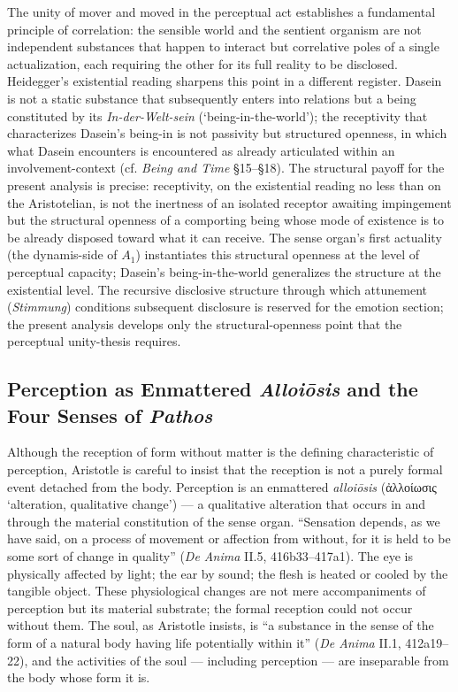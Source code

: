 \documentclass{article}
\newcommand{\gk}[1]{{\greekfont #1}}
\begin{document}
The unity of mover and moved in the perceptual act establishes a fundamental principle of correlation: the sensible world and the sentient organism are not independent substances that happen to interact but correlative poles of a single actualization, each requiring the other for its full reality to be disclosed. Heidegger's existential reading sharpens this point in a different register. Dasein is not a static substance that subsequently enters into relations but a being constituted by its \textit{In-der-Welt-sein} (`being-in-the-world'); the receptivity that characterizes Dasein's being-in is not passivity but structured openness, in which what Dasein encounters is encountered as already articulated within an involvement-context (cf. \textit{Being and Time} \S 15--\S 18). The structural payoff for the present analysis is precise: receptivity, on the existential reading no less than on the Aristotelian, is not the inertness of an isolated receptor awaiting impingement but the structural openness of a comporting being whose mode of existence is to be already disposed toward what it can receive. The sense organ's first actuality (the dynamis-side of $A_1$) instantiates this structural openness at the level of perceptual capacity; Dasein's being-in-the-world generalizes the structure at the existential level. The recursive disclosive structure through which attunement (\textit{Stimmung}) conditions subsequent disclosure is reserved for the emotion section; the present analysis develops only the structural-openness point that the perceptual unity-thesis requires.

\subsection{Perception as Enmattered \textit{Alloiōsis} and the Four Senses of \textit{Pathos}}

Although the reception of form without matter is the defining characteristic of perception, Aristotle is careful to insist that the reception is not a purely formal event detached from the body. Perception is an enmattered \textit{alloiōsis} (\gk{ἀλλοίωσις} `alteration, qualitative change') --- a qualitative alteration that occurs in and through the material constitution of the sense organ. ``Sensation depends, as we have said, on a process of movement or affection from without, for it is held to be some sort of change in quality'' (\textit{De Anima} II.5, 416b33--417a1). The eye is physically affected by light; the ear by sound; the flesh is heated or cooled by the tangible object. These physiological changes are not mere accompaniments of perception but its material substrate; the formal reception could not occur without them. The soul, as Aristotle insists, is ``a substance in the sense of the form of a natural body having life potentially within it'' (\textit{De Anima} II.1, 412a19--22), and the activities of the soul --- including perception --- are inseparable from the body whose form it is.
\end{document}
